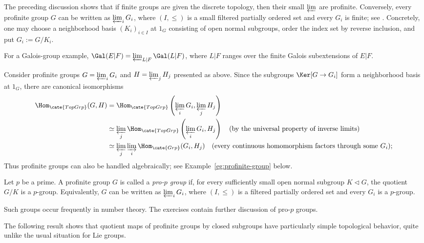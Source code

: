 \begin{remark}\label{rem:profinite-group-lim}
	The preceding discussion shows that if finite groups are given the discrete topology, then their small $\varprojlim$ are profinite. Conversely, every profinite group $G$ can be written as $\varprojlim_iG_i$, where $(I,\leq)$ is a small filtered partially ordered set and every $G_i$ is finite; see \cite[Theorem 4.10.6]{Li1}. Concretely, one may choose a neighborhood basis $(K_i)_{i\in I}$ at $1_G$ consisting of open normal subgroups, order the index set by reverse inclusion, and put $G_i:=G/K_i$.

	For a Galois-group example,
	$\Gal(E|F)=\varprojlim_{L|F}\Gal(L|F)$, where $L|F$ ranges over the finite Galois subextensions of $E|F$.

	Consider profinite groups $G=\varprojlim_iG_i$ and $H=\varprojlim_jH_j$ presented as above. Since the subgroups $\Ker[G\to G_i]$ form a neighborhood basis at $1_G$, there are canonical isomorphisms
	{\scriptsize
	\begin{align*}
		\Hom_{\cate{TopGrp}}(G, H) & = \Hom_{\cate{TopGrp}}\left(\varprojlim_i G_i, \varprojlim_j H_j \right) \\
		& \simeq \varprojlim_j \Hom_{\cate{TopGrp}}\left( \varprojlim_i G_i, H_j \right) \quad \text{(by the universal property of inverse limits)} \\
		& \simeq \varprojlim_j \varinjlim_i \Hom_{\cate{Grp}}(G_i,H_j) \quad \text{(every continuous homomorphism factors through some \(G_i\))};
	\end{align*}
	}
	Thus profinite groups can also be handled algebraically; see Example~\ref{eg:profinite-group} below.
\end{remark}

\begin{definition}
	Let $p$ be a prime. A profinite group $G$ is called a \emph{pro-$p$ group} if, for every sufficiently small open normal subgroup $K\lhd G$, the quotient $G/K$ is a $p$-group. Equivalently, $G$ can be written as $\varprojlim_iG_i$, where $(I,\leq)$ is a filtered partially ordered set and every $G_i$ is a $p$-group.
\end{definition}

Such groups occur frequently in number theory. The exercises contain further discussion of pro-$p$ groups.

The following result shows that quotient maps of profinite groups by closed subgroups have particularly simple topological behavior, quite unlike the usual situation for Lie groups.

